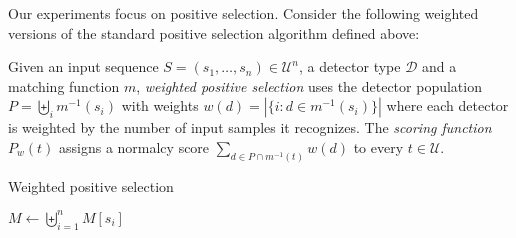 \documentclass{llncs}
\begin{document}
Our experiments focus on positive selection. 
Consider the following weighted versions of the standard positive  
selection algorithm defined above:

Given an input sequence  $S=(s_1,\ldots,s_n) \in \mathcal{U}^n$, a detector type $\mathcal{D}$ and a matching function $m$, %
\emph{weighted positive selection} uses the detector population $P = \biguplus_i m^{-1}(s_i)$ with weights $w(d) = |\{i : d \in m^{-1}(s_i)\}|$ where each detector is weighted by the number of input samples it recognizes.
The \emph{scoring function} $P_w(t)$ assigns a normalcy score $\sum_{d \in P \cap m^{-1}(t)} w(d)$
to every $t \in \mathcal{U}$.

\begin{algorithm}
\caption{Weighted positive selection}



$M \gets \biguplus_{i=1}^{n} M[s_i]$ 

\label{algorithmweightedpossel}
\end{algorithm}




\end{document}
